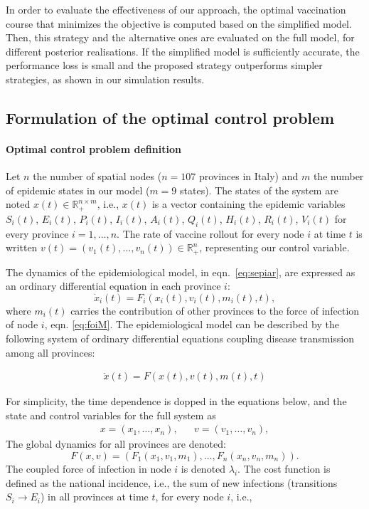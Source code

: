 In order to evaluate the effectiveness of our approach, the optimal vaccination course that minimizes the objective is computed based on the simplified model. Then, this strategy and the alternative ones are evaluated on the full model, for different posterior realisations. If the simplified model is sufficiently accurate, the performance loss is small and the proposed strategy outperforms simpler strategies, as shown in our simulation results.

\subsection{Formulation of the optimal control problem}
\paragraph{Optimal control problem definition}Let $n$ the number of spatial nodes ($n=107$ provinces in Italy) and $m$ the number of epidemic states in our model ($m=9$ states).
The states of the system are noted $x(t) \in \mathbb{R}_+^{n\times m}$, i.e., $x(t)$ is a vector containing the epidemic variables $S_i(t)$, $E_i(t)$, $P_i(t)$, $I_i(t)$, $A_i(t)$, $Q_i(t)$, $H_i(t)$, $R_i(t)$, $V_i(t)$ for every province $i=1,...,n$. The rate of vaccine rollout for every node $i$ at time $t$ is written $v(t) = (v_1(t),...,v_n(t)) \in \mathbb{R}_+^{n}$, representing our control variable. %

The dynamics of the epidemiological model, in eqn.~\eqref{eq:sepiar}, are expressed as an ordinary differential equation in each province $i$:
\begin{equation}
    \label{eq:sepiar_compact}
    \dot x_i(t) = F_i(x_i(t),v_i(t), m_i(t), t),
\end{equation}
where $m_i(t)$ carries the contribution of other provinces to the force of infection of node $i$, \ie eqn. \eqref{eq:foiM}. The epidemiological model can be described by the following system of ordinary differential equations coupling disease transmission among all provinces:

\begin{align}
    \dot x(t) = F(x(t),v(t),m(t),t)
    \label{eq:dynamics}
\end{align}

For simplicity, the time dependence is dopped in the equations below, and the state and control variables for the full system as
\begin{align*}
    x = (x_1,\ldots,x_n), && v = (v_1,\ldots,v_n),
\end{align*}
The global dynamics for all provinces are denoted:
\begin{equation*}
    F(x,v) = (F_1(x_1,v_1, m_1),\ldots,F_n(x_n,v_n, m_n)).
\end{equation*}
The coupled force of infection in node $i$ is denoted $\lambda_i$. The cost function is defined as the national incidence, i.e., the sum of new infections (transitions $S_i\longrightarrow E_i$) in all provinces at time $t$,  for every node $i$, i.e.,

